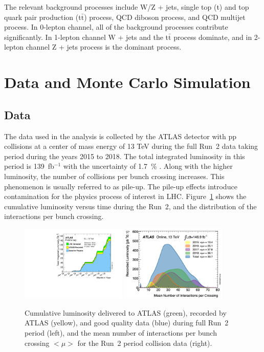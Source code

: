 The relevant background processes include W/Z + jets, single top (t) and top quark pair production (t$\bar{\mathrm{t}}$) process, QCD diboson process, and QCD multijet process.
In 0-lepton channel, all of the background processes contribute significantly. In 1-lepton channel W + jets and the t$\bar{\mathrm{t}}$ process dominate, and in 2-lepton channel Z + jets process is the dominant process.

\section{Data and Monte Carlo Simulation}
\subsection{Data}
The data used in the analysis is collected by the ATLAS detector with pp collisions at a center of mass energy of 13 TeV during the full Run~2 data taking period during the years 2015 to 2018. The total integrated luminosity in this period is 139~fb$^{-1}$ with the uncertainty of 1.7~\% \cite{DAPR-2010-01}. 
Along with the higher luminosity, the number of collisions per bunch crossing increases. This phenomenon is usually referred to as pile-up. The pile-up effects introduce contamination for the physics process of interest in LHC.
Figure~\ref{fig:luminosity} shows the cumulative luminosity versus time during the Run~2, and the distribution of the interactions per bunch crossing.
\begin{figure}[H]
\begin{center}
 \includegraphics[width=0.45\textwidth,keepaspectratio]{figures/intlumivstimeRun2DQall.pdf}
 \includegraphics[width=0.45\textwidth,keepaspectratio]{figures/pileup}
\caption[f]{
Cumulative luminosity delivered to ATLAS (green), recorded by ATLAS (yellow), and good quality data (blue) during full Run~2 period (left), and the mean number of interactions per bunch crossing $<\mu>$ for the Run~2 period collision data (right).~\cite{DAPR-2010-01}
}
\label{fig:luminosity}
\end{center}
\end{figure}

